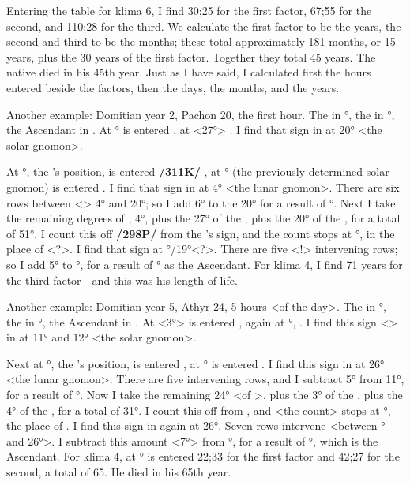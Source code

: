 Entering the table for klima 6, I find 30;25 for the first factor, 67;55 for the second, and 110;28 for the third. We calculate the first factor to be the years, the second and third to be the months; these total approximately 181 months, or 15 years, plus the 30 years of the first factor. Together they total 45 years. The native died in his 45th year.
Just as I have said, I calculated first the hours entered beside the factors, then the days, the months, and the years.

Another example: Domitian year 2, Pachon 20, the first hour. The \Sun\xspace in \Taurus\xspace 27°, the \Moon\xspace in \Virgo\xspace 20°, the Ascendant in \Gemini. At \Taurus\xspace 27° is entered \Aries, at \Aries\xspace <27°> \Cancer. I find that
sign in \Gemini\xspace at 20° <the solar gnomon>. 

At \Virgo\xspace 20°, the \Moon’s position, is entered \textbf{/311K/} \Cancer, at \Cancer\xspace 20° (the previously determined solar gnomon) is entered \Virgo. I find that sign in \Gemini\xspace at 4°
<the lunar gnomon>. There are six rows between <\Gemini> 4° and 20°; so I add 6° to the 20° for a result of \Gemini\xspace 26°. Next I take the remaining degrees of \Gemini, 4°, plus the 27° of the \Sun, plus the 20° of the \Moon, for a total of 51°. I count this off \textbf{/298P/} from the \Moon’s sign, and the count stops at \Libra\xspace 21°, in the place of <\Cancer?>. I find that sign at \Gemini\xspace 11°/19°<?>. There are five <!> intervening rows; so I add 5° to \Gemini\xspace 26°, for a result of \Cancer\xspace 1° as the Ascendant. For klima 4, I find 71 years for the third factor—and this was his length of life.

Another example: Domitian year 5, Athyr 24, 5 hours <of the day>. The \Sun\xspace in °, the \Moon\xspace in \Gemini\xspace 4°, the Ascendant in \Pisces. At \Sagittarius\xspace <3°> is entered \Sagittarius, again at \Sagittarius\xspace 3°, \Sagittarius. I find this sign <\Sagittarius> in \Pisces\xspace at 11° and 12° <the solar gnomon>. 

Next at \Gemini\xspace 4°, the \Moon’s position, is entered \Virgo, at \Virgo\xspace 11° is entered \Scorpio. I find this sign in \Pisces\xspace at 26° <the lunar gnomon>. There are five intervening rows, and I subtract 5° from 11°, for a result of \Pisces\xspace 6°. Now I take the remaining 24° <of \Pisces>, plus the 3° of the \Sun, plus the 4° of the \Moon, for a total of 31°. I count this off from \Gemini, and <the count> stops at \Cancer\xspace 1°, the place of \Scorpio. I find this sign in \Pisces\xspace again at 26°. Seven rows intervene <between \Pisces\xspace 6° and 26°>. I subtract this amount <7°> from \Pisces\xspace 6°, for a result of \Aquarius\xspace 29°, which is the Ascendant. For klima 4, at \Aquarius\xspace 29° is entered 22;33 for the first factor and 42;27 for the second, a total of 65. He died in his
65th year.

